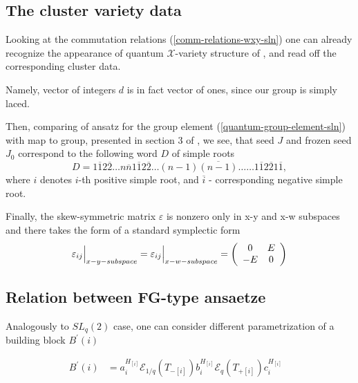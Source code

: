 \documentclass{article}
\newcommand{\lb}{\left (}
\newcommand{\rb}{\right )}
\newcommand{\lsb}{\left [}
\newcommand{\rsb}{\right ]}
\newcommand{\SB}[1]{\lsb #1 \rsb}
\newcommand{\ve}{\varepsilon}
\newcommand {\?}{\textit{???}}
\newcommand{\me}[0]{\mathcal{E}}
\newcommand{\Bp}[1]{B^{'}\lb #1 \rb}
\newcommand{\Tp}[1][]{T_{+ #1}}
\newcommand{\Tm}[1][]{T_{- #1}}
\newcommand{\delabel}[1]{(\ref{#1})}
\begin{document}
\subsection{The cluster variety data}

Looking at the commutation relations \delabel{comm-relations-wxy-sln} one can already
recognize the appearance of quantum $\mathcal{X}$-variety structure of \cite{FG1},
and read off the corresponding cluster data.

Namely, vector of integers $d$ is in fact vector of ones, since our group is simply laced.

Then, comparing of ansatz for the group element \delabel{quantum-group-element-sln}
with map to group, presented in section 3 of \cite{FG2}, we see, that
seed $J$ and frozen seed $J_0$ correspond to the following word $D$ of simple roots
\begin{equation}
D = 1 \overline{1} 2 \overline{2} \dots n \overline{n} 1 \overline{1} 2 \overline{2} \dots (n - 1)\overline{(n-1)}
\dots \dots 1 \overline{1} 2 \overline{2} 1 \overline{1},
\end{equation}
where $i$ denotes $i$-th positive simple root, and $\overline{i}$ - corresponding negative simple root.

Finally, the skew-symmetric matrix $\ve$ is nonzero only in x-y and x-w subspaces and
there takes the form of a standard symplectic form
\begin{equation}
  \ve_{ij} \Big{|}_{x-y-subspace} = \ve_{ij} \Big{|}_{x-w-subspace} = \lb \begin{array}{cc} 0 & E \\ -E & 0 \end{array} \rb
\end{equation}


\subsection{Relation between FG-type ansaetze}

Analogously to $SL_q(2)$ case, one can consider different parametrization
of a building block $\Bp{i}$

\begin{align}
\label{building-block-alt-sln-fg}
\Bp{i} & = a_i^{H_{\SB{i}}} \me_{1/q} \lb \Tm[\SB{i}] \rb b_i^{H_{\SB{i}}} \me_{q} \lb \Tp[\SB{i}] \rb c_i^{H_{\SB{i}}} &
\end{align}
\end{document}
